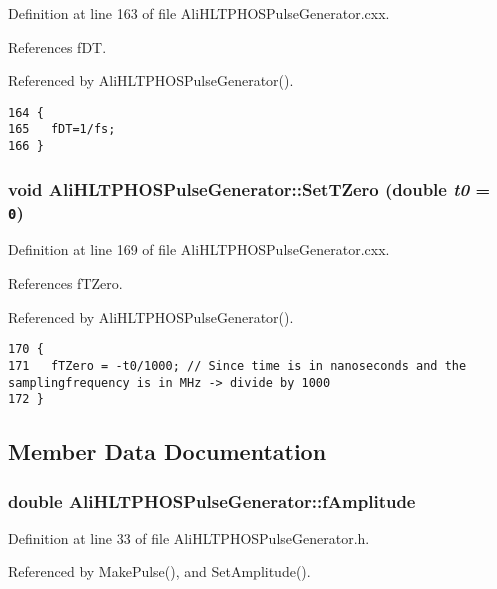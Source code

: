 Definition at line 163 of file Ali\-HLTPHOSPulse\-Generator.cxx.

References f\-DT.

Referenced by Ali\-HLTPHOSPulse\-Generator().

\footnotesize\begin{verbatim}164 {
165   fDT=1/fs;  
166 }
\end{verbatim}\normalsize 


\subsubsection{\setlength{\rightskip}{0pt plus 5cm}void Ali\-HLTPHOSPulse\-Generator::Set\-TZero (double {\em t0} = {\tt 0})}\label{classAliHLTPHOSPulseGenerator_a14}




Definition at line 169 of file Ali\-HLTPHOSPulse\-Generator.cxx.

References f\-TZero.

Referenced by Ali\-HLTPHOSPulse\-Generator().

\footnotesize\begin{verbatim}170 {
171   fTZero = -t0/1000; // Since time is in nanoseconds and the samplingfrequency is in MHz -> divide by 1000
172 }
\end{verbatim}\normalsize 




\subsection{Member Data Documentation}
\subsubsection{\setlength{\rightskip}{0pt plus 5cm}double {\bf Ali\-HLTPHOSPulse\-Generator::f\-Amplitude}\hspace{0.3cm}{\tt  [private]}}\label{classAliHLTPHOSPulseGenerator_r0}




Definition at line 33 of file Ali\-HLTPHOSPulse\-Generator.h.

Referenced by Make\-Pulse(), and Set\-Amplitude().
